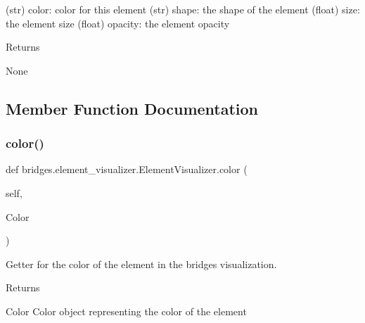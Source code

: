 (str) color\+: color for this element (str) shape\+: the shape of the element (float) size\+: the element size (float) opacity\+: the element opacity \begin{DoxyReturn}{Returns}


None 
\end{DoxyReturn}


\subsection{Member Function Documentation}
\mbox{\label{classbridges_1_1element__visualizer_1_1_element_visualizer_acb214c900f5e13f694aa04f284ec55e2}} 
\subsubsection{\texorpdfstring{color()}{color()}\hspace{0.1cm}{\footnotesize\ttfamily [1/2]}}
{\footnotesize\ttfamily def bridges.\+element\+\_\+visualizer.\+Element\+Visualizer.\+color (\begin{DoxyParamCaption}\item[{}]{self,  }\item[{}]{Color }\end{DoxyParamCaption})}



Getter for the color of the element in the bridges visualization. 

\begin{DoxyReturn}{Returns}


Color Color object representing the color of the element 
\end{DoxyReturn}
\mbox{\label{classbridges_1_1element__visualizer_1_1_element_visualizer_a8579ca1bda361a0ba44efda8683480bd}} 
